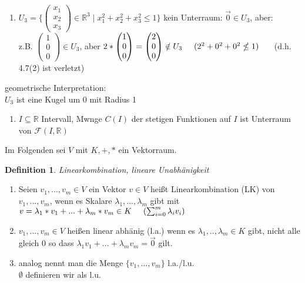 \documentclass[a4paper,11pt]{article}
\newtheorem{definition}{Definition}[section]
\begin{document}
\begin{enumerate}[label=\alph*)]
\item $U_3=\{\begin{pmatrix}x_1\\x_2\\x_3\end{pmatrix}\in\mathbb{R}^3\mid x_1^2+x_2^2+x_3^2\leq1\}$ kein Unterraum: $\overset{\rightarrow}{0}\in U_3$, aber: \\
z.B. $\begin{pmatrix}1\\0\\0\end{pmatrix}\in U_3$, aber $2*\begin{pmatrix}1\\0\\0\end{pmatrix}=\begin{pmatrix}2\\0\\0\end{pmatrix}\notin U_3\hspace{5mm}(2^2+0^2+0^2\nleq1)\hspace{5mm}$ (d.h. 4.7(2) ist verletzt)
\end{enumerate}
geometrische Interpretation: \\
$U_3$ ist eine Kugel um 0 mit Radius 1
\begin{enumerate}[label=\alph*), start=5]
\item $I\subseteq\mathbb{R}$ Intervall, Mwnge $C(I)$ der stetigen Funktionen auf $I$ ist Unterraum von $\mathscr{F}(I,\mathbb{R})$
\end{enumerate}
Im Folgenden sei $V$ mit $K,+,*$ ein Vektorraum.
\begin{definition}
Linearkombination, lineare Unabhänigkeit
\end{definition}
\begin{enumerate}[label=\alph*)]
\item Seien $v_1,...,v_m\in V$ ein Vektor $v\in V$ heißt Linearkombination (LK) von $v_1,...,v_m$, wenn es Skalare $\lambda_1,...,\lambda_m$ gibt mit $v=\lambda_1*v_1+...+\lambda_m*v_m\in K\hspace{5mm}(\sum^m_{i=0}\lambda_iv_i)$
\item $v_1,...,v_m\in V$ heißen linear abhänig (l.a.) wenn es $\lambda_1,..,\lambda_m\in K$ gibt, nicht alle gleich 0 so dass $\lambda_1v_1+...+\lambda_mv_m=\overset{\rightarrow}{0}$ gilt.
\item analog nennt man die Menge $\{v_1,...,v_m\}$ l.a./l.u. \\
$\emptyset$ definieren wir als l.u.
\end{enumerate}
\end{document}
